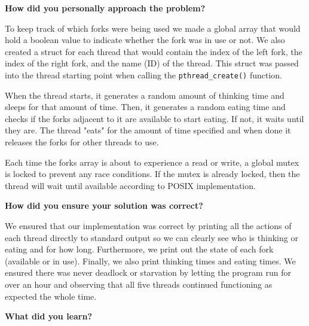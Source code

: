 \documentclass[10pt,letterpaper,draftclsnofoot,onecolumn]{IEEEtran}
\begin{document}
\bigskip

\noindent\textbf{How did you personally approach the problem?}
\medskip

\medskip

\noindent To keep track of which forks were being used we made a global array that would hold a boolean value to indicate whether the fork was in use or not. We also created a struct for each thread that would contain the index of the left fork, the index of the right fork, and the name (ID) of the thread. This struct was passed into the thread starting point when calling the \texttt{pthread\_create()} function.\par
\medskip

\medskip

\noindent When the thread starts, it generates a random amount of thinking time and sleeps for that amount of time. Then, it generates a random eating time and checks if the forks adjacent to it are available to start eating. If not, it waits until they are. The thread "eats" for the amount of time specified and when done it releases the forks for other threads to use.\par
\medskip

\medskip

\noindent Each time the forks array is about to experience a read or write, a global mutex is locked to prevent any race conditions. If the mutex is already locked, then the thread will wait until available according to POSIX implementation.\par

\bigskip

\noindent\textbf{How did you ensure your solution was correct?}
\medskip

\medskip

\noindent We ensured that our implementation was correct by printing all the actions of each thread directly to standard output so we can clearly see who is thinking or eating and for how long. Furthermore, we print out the state of each fork (available or in use). Finally, we also print thinking times and eating times. We ensured there was never deadlock or starvation by letting the program run for over an hour and observing that all five threads continued functioning as expected the whole time.\par

\bigskip

\noindent\textbf{What did you learn?}
\medskip

\medskip
\end{document}

